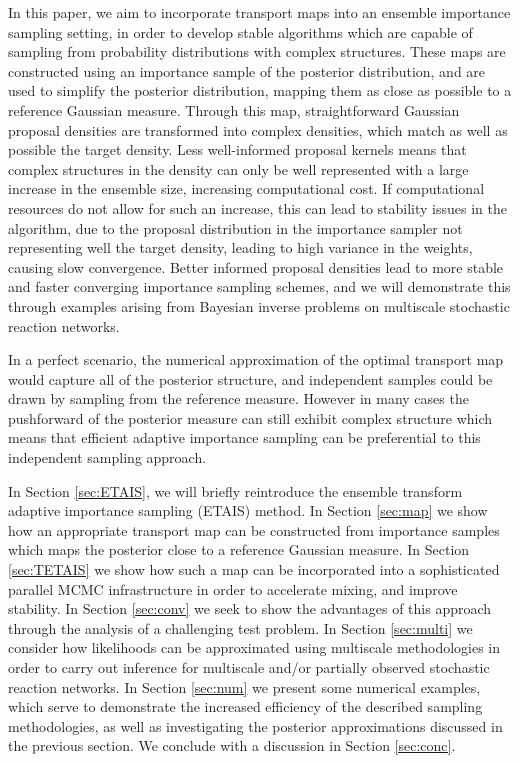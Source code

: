 \documentclass[final]{siamltex}
\newcommand{\edit}[1]{{\color{red} #1}}
\begin{document}

In this paper, we aim to incorporate transport maps into an ensemble
importance sampling setting, in order to develop stable algorithms which are
capable of sampling from probability distributions with complex
structures. These maps are constructed using an importance sample of
the posterior distribution, and are used to simplify the posterior
distribution, mapping them as close as possible to a reference
Gaussian measure. Through this map, straightforward Gaussian proposal
densities are transformed into complex densities, which match as well
as possible the target density. Less well-informed proposal kernels means that complex
structures in the density can only be well represented with a large
increase in the ensemble size, increasing computational cost. If
computational resources do not allow for such an increase, this can
lead to stability issues in the algorithm, due to the proposal
distribution in the importance sampler not representing well the
target density, leading to high variance in the weights, causing slow
convergence. Better informed proposal densities
lead to more stable and faster converging importance sampling
schemes, and we will demonstrate this through examples
arising from Bayesian inverse problems on multiscale stochastic
reaction networks.

\edit{In a perfect scenario, the numerical
  approximation of the optimal transport map would capture all of the
  posterior structure, and independent samples could be drawn by
  sampling from the reference measure. However in many cases the pushforward of the posterior measure can still exhibit complex structure
  which means that efficient adaptive importance sampling can be
  preferential to this independent sampling approach.}




In Section \ref{sec:ETAIS}, we will briefly reintroduce the ensemble
transform adaptive importance sampling (ETAIS) method. In Section \ref{sec:map} we show how an appropriate transport map can
be constructed from importance samples which maps the posterior close
to a reference Gaussian measure. In Section \ref{sec:TETAIS} we show
how such a map can be incorporated into a sophisticated parallel MCMC
infrastructure in order to accelerate mixing, and improve stability. In Section
\ref{sec:conv} we seek to show the advantages of this approach through
the analysis of a challenging test problem. In Section
\ref{sec:multi} we consider how likelihoods can be approximated using
 multiscale methodologies in order to carry out inference for
multiscale and/or partially observed stochastic reaction networks. In
Section \ref{sec:num} we present some numerical examples, which serve
to demonstrate the increased efficiency of the described sampling
methodologies, as well as investigating the posterior approximations
discussed in the previous section. We conclude with a discussion in
Section \ref{sec:conc}.
\end{document}
